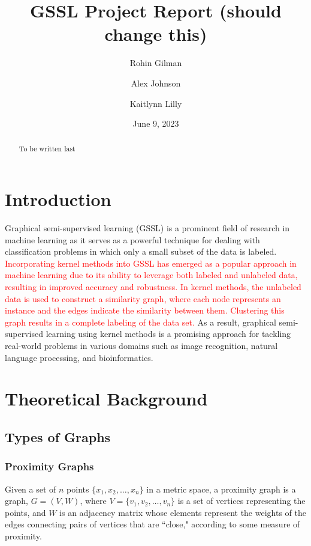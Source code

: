 \documentclass[12pt]{amsart}
\title{GSSL Project Report (should change this)}
\author{Rohin Gilman \and Alex Johnson \and Kaitlynn Lilly}
\date{June 9, 2023}
\begin{document}
\begin{abstract}
	To be written last
\end{abstract}

\maketitle

\section{Introduction} 
Graphical semi-supervised learning (GSSL) is a prominent field of research in machine learning as it serves as a powerful technique for dealing with classification problems in which only a small subset of the data is labeled. \textcolor{red}{Incorporating kernel methods into GSSL has emerged as a popular approach in machine learning due to its ability to leverage both labeled and unlabeled data, resulting in improved accuracy and robustness. In kernel methods, the unlabeled data is used to construct a similarity graph, where each node represents an instance and the edges indicate the similarity between them. Clustering this graph results in a complete labeling of the data set.} As a result, graphical semi-supervised learning using kernel methods is a promising approach for tackling real-world problems in various domains such as image recognition, natural language processing, and bioinformatics.

\section{Theoretical Background}

\subsection{Types of Graphs}
\subsubsection{Proximity Graphs}
Given a set of $n$ points $\{x_1, x_2, \dots, x_n\}$ in a metric space, a proximity graph is a graph, $G = (V, W)$, where $V = \{v_1, v_2, \dots, v_n\}$ is a set of vertices representing the points, and $W$ is an adjacency matrix whose elements represent the weights of the edges connecting pairs of vertices that are ``close," according to some measure of proximity.
\end{document}

